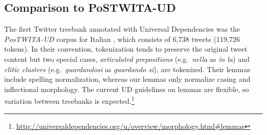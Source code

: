 \documentclass[11pt,a4paper]{article}
\newcommand{\nss}[1]{\textcolor{magenta}{[$_\mathrm{S}^\mathrm{NS}$#1]}}
\begin{document}
\subsection{Comparison to PoSTWITA-UD}\label{sec:postwita}
The first Twitter treebank annotated with Universal Dependencies 
was the \mbox{\textit{PosTWITA-UD}} corpus for Italian \citep{sanguinetti-17}, 
which consists of 6,738 tweets (119,726 tokens).
In their convention, tokenization tends to preserve the original
tweet content but two special cases, \textit{articulated prepositions}
(e.g.~\textit{nella} as \textit{in la})
and \textit{clitic clusters} (e.g.~\textit{guardandosi} as \textit{guardando si}), are tokenized.
Their lemmas include spelling normalization, whereas our lemmas only normalize casing and inflectional morphology.
The current UD guidelines on lemmas are flexible, so variation between treebanks is expected.\footnote{\url{http://universaldependencies.org/u/overview/morphology.html\#lemmas}}
\end{document}
